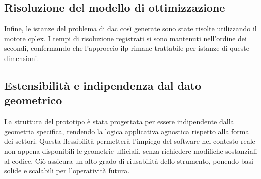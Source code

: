 \subsection{Risoluzione del modello di ottimizzazione}
Infine, le istanze del problema di \gls{dac} così generate sono state risolte utilizzando il motore \gls{cplex}. I tempi di risoluzione registrati si sono mantenuti nell'ordine dei secondi, confermando che l'approccio \gls{ilp} rimane trattabile per istanze di queste dimensioni.

\subsection{Estensibilità e indipendenza dal dato geometrico}
La struttura del prototipo è stata progettata per essere indipendente dalla geometria specifica, rendendo la logica applicativa agnostica rispetto alla forma dei settori. Questa flessibilità permetterà l'impiego del software nel contesto reale non appena disponibili le geometrie ufficiali, senza richiedere modifiche sostanziali al codice. Ciò assicura un alto grado di riusabilità dello strumento, ponendo basi solide e scalabili per l'operatività futura.